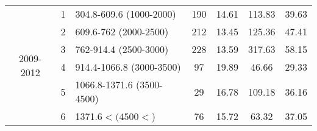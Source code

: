 \begin{table}[htbp]
\begin{tabular}{rrlcccc}
    \multicolumn{1}{c}{\multirow{6}[2]{*}{\begin{sideways}2009-2012\end{sideways}}} & \multicolumn{1}{c}{1} & \multicolumn{1}{l}{304.8-609.6 (1000-2000)} & 190   & 14.61  & 113.83  & 39.63  \\
    \multicolumn{1}{c}{} & \multicolumn{1}{c}{2} & \multicolumn{1}{l}{609.6-762 (2000-2500)} & 212   & 13.45  & 125.36  & 47.41  \\
    \multicolumn{1}{c}{} & \multicolumn{1}{c}{3} & \multicolumn{1}{l}{762-914.4 (2500-3000)} & 228   & 13.59  & 317.63  & 58.15  \\
    \multicolumn{1}{c}{} & \multicolumn{1}{c}{4} & \multicolumn{1}{l}{914.4-1066.8 (3000-3500)} & 97    & 19.89  & 46.66  & 29.33  \\
    \multicolumn{1}{c}{} & \multicolumn{1}{c}{5} & \multicolumn{1}{l}{1066.8-1371.6 (3500-4500)} & 29    & 16.78  & 109.18  & 36.16  \\
    \multicolumn{1}{c}{} & \multicolumn{1}{c}{6} & \multicolumn{1}{l}{1371.6$< (4500<$)} & 76    & 15.72  & 63.32  & 37.05  \\
    \bottomrule
    \end{tabular}%
  \label{tab:DSSO4}%
\end{table}%
